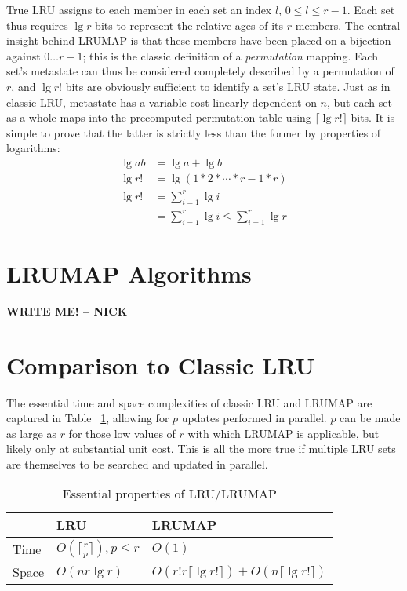 \documentclass[10pt]{sigplanconf}
\begin{document}
True LRU assigns to each member in each set an index $l$, $0\le{l}\le{r-1}$.
Each set thus requires $\lg{r}$ bits to represent the relative ages of its $r$
members. The central insight behind LRUMAP is that these members have been
placed on a bijection against $0\dotsc{r-1}$; this is the classic definition of
a \textit{permutation} mapping. Each set's metastate can thus be considered
completely described by a permutation of $r$, and $\lg{r!}$ bits are obviously
sufficient to identify a set's LRU state. Just as in classic LRU, metastate has
a variable cost linearly dependent on $n$, but each set as a whole maps into
the precomputed permutation table using $\lceil\lg{r!}\rceil$ bits. It is
simple to prove that the latter is strictly less than the former by properties
of logarithms:
\begin{align*}
\lg{ab} &= \lg{a} + \lg{b} \\
\lg{r!} &= \lg{(1*2*\dotsb*r-1*r)} \\
\lg{r!} &= \sum_{i=1}^{r}{\lg{i}} \\
&= \sum_{i=1}^{r}{\lg{i}} \le \sum_{i=1}^{r}{\lg{r}}
\end{align*}
\section{LRUMAP Algorithms}
\textbf{WRITE ME! -- NICK}
\section{Comparison to Classic LRU}
The essential time and space complexities of classic LRU and LRUMAP are
captured in Table ~\ref{tab:lru}, allowing for $p$ updates performed in
parallel. $p$ can be made as large as $r$ for those low values of $r$ with
which LRUMAP is applicable, but likely only at substantial unit cost. This is
all the more true if multiple LRU sets are themselves to be searched and
updated in parallel.

\begin{table}
\begin{center}
	\begin{tabular}{|l|l|l|}
	\hline
	& LRU & LRUMAP \\
	\hline
	Time & $O(\lceil\frac{r}{p}\rceil), {p}\le{r}$ & $O(1)$ \\
	\hline
	Space & $O(nr\lg{r})$ & $O(r!r\lceil\lg{r!}\rceil) + O(n\lceil\lg{r!}\rceil)$ \\
	\hline
	\end{tabular}
	\caption{Essential properties of LRU/LRUMAP}
\label{tab:lru}
\end{center}
\end{table}
\end{document}
